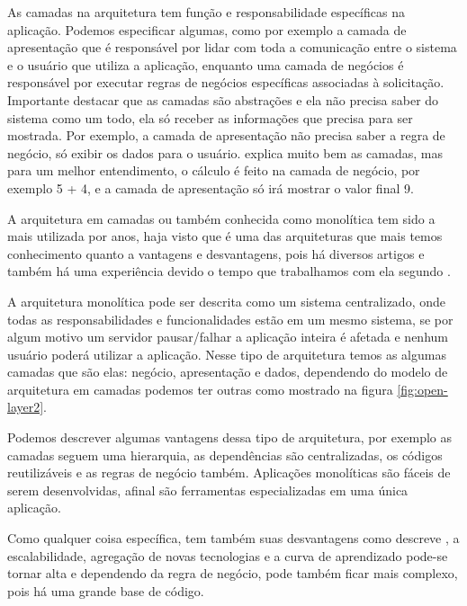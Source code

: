 As camadas na arquitetura tem função e responsabilidade específicas na aplicação. Podemos especificar algumas, como por exemplo a camada de apresentação que é responsável por lidar com toda a comunicação entre o sistema e o usuário que utiliza a aplicação, enquanto uma camada de negócios é responsável por executar regras de negócios específicas associadas à solicitação. Importante destacar que as camadas são abstrações e ela não precisa saber do sistema como um todo, ela só receber as informações que precisa para ser mostrada. Por exemplo, a camada de apresentação não precisa saber a regra de negócio, só exibir os dados para o usuário. \cite{Richards2015} explica muito bem as camadas, mas para um melhor entendimento, o cálculo é feito na camada de negócio, por exemplo 5 + 4, e a camada de apresentação só irá mostrar o valor final 9.

A arquitetura em camadas ou também conhecida como monolítica tem sido a mais utilizada por anos, haja visto que é uma das arquiteturas que mais temos conhecimento quanto a vantagens e desvantagens, pois há diversos artigos e também há uma experiência devido o tempo que trabalhamos com ela segundo \cite{Batista2018}.

A arquitetura monolítica pode ser descrita como um sistema centralizado, onde todas as responsabilidades e funcionalidades estão em um mesmo sistema, se por algum motivo um servidor pausar/falhar a aplicação inteira é afetada e nenhum usuário poderá utilizar a aplicação. Nesse tipo de arquitetura temos as algumas camadas que são elas: negócio, apresentação e dados, dependendo do modelo de arquitetura em camadas podemos ter outras como mostrado na figura \ref{fig:open-layer2}.

Podemos descrever algumas vantagens dessa tipo de arquitetura, por exemplo as camadas seguem uma hierarquia, as dependências são centralizadas, os códigos reutilizáveis e as regras de negócio também. Aplicações monolíticas são fáceis de serem desenvolvidas, afinal são ferramentas especializadas em uma única aplicação.

Como qualquer coisa específica, tem também suas desvantagens como descreve \cite{Batista2018}, a escalabilidade, agregação de novas tecnologias e a curva de aprendizado pode-se tornar alta e dependendo da regra de negócio, pode também ficar mais complexo, pois há uma grande base de código.


